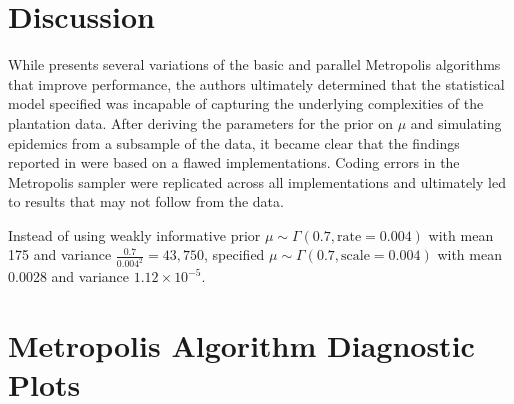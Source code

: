 \documentclass{uwstat572}
\begin{document}
\section{Discussion}
While \citet{Brown} presents several variations of the basic and parallel Metropolis algorithms that improve performance, the authors ultimately determined that the statistical model specified was incapable of capturing the underlying complexities of the plantation data. 
After deriving the parameters for the prior on $\mu$ and simulating epidemics from a subsample of the data, it became clear that the findings reported in \citet{Brown} were based on a flawed implementations. 
Coding errors in the Metropolis sampler were replicated across all implementations and ultimately led to results that may not follow from the data.

Instead of using weakly informative prior $\mu \sim \Gamma(0.7, \text{rate}=0.004)$ with mean 175 and variance $\frac{0.7}{0.004^2}=43,750$, \citep{Brown} specified $\mu \sim \Gamma(0.7, \text{scale}=0.004)$ with mean 0.0028 and variance $1.12\times10^{-5}$. 

\newpage


\newpage
\appendix
\section{Metropolis Algorithm Diagnostic Plots}
\label{metropolis_plots}
\end{document}
